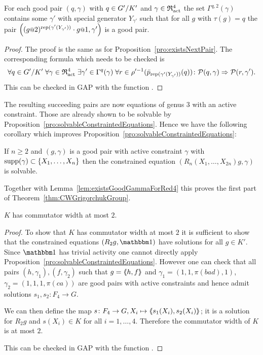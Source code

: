 \documentclass[a4paper,11pt]{amsart}
\begin{document}
\begin{pro}\label{pro:existsNextPair4}
 For each good pair $(q,\gamma)$ with $q\in{G'/K'}$ and $\gamma\in\mathfrak{R}^4_{\operatorname{act}}$ the set 
  $\Gamma^{q,2}(\gamma)$
 contains some $\gamma'$ with special generator $Y_{\gamma'}$ such that for all $g$ with $\tau(g)=q$ the
 pair $\left((g\at{2})^{\rep(\gamma'(Y_{\gamma'}))}\cdot g\at{1},\gamma'\right)$ is a good pair.
\end{pro}
\begin{proof}
The proof is the same as for Proposition~\ref{pro:existsNextPair}. The corresponding formula which needs to be checked is 
\[\forall q\in{G'/K'}\;
      \forall \gamma\in\mathfrak{R}^4_{\operatorname{act}}\;
	 \exists \gamma'\in \Gamma^q(\gamma)\;
	    \forall r\in \rho'^{-1}(\bar p_{\operatorname{rep}(\gamma'(Y_{\gamma'}))}(q))\colon
	      \mathcal{P}(q,\gamma) \Rightarrow \mathcal{P}(r,\gamma').\]
 This can be checked in GAP with the function . 
\end{proof}
The resulting succeeding pairs are now equations of genus $3$ with an active constraint. 
Those are already shown to be solvable 
by Proposition~\ref{pro:solvableConstraintedEquations}. Hence we have the following
corollary which improves Proposition~\ref{pro:solvableConstraintedEquations}:
\begin{cor}\label{cor:solvableConstraintedEquations}
If $n\geq2$ and $(g,\gamma)$ is a good pair with active constraint $\gamma$ with $\operatorname{{supp}}(\gamma)\subset\{X_1,\dotsc,X_{n}\}$
 then the constrained equation $(R_n(X_1,\dotsc,X_{2n})g,\gamma)$ is solvable. 
\end{cor}
Together with Lemma~\ref{lem:existsGoodGammaForRed4} this proves the first part of Theorem~\ref{thm:CWGrigorchukGroup}.
\begin{cor}\label{cor:KhasCW2}
 $K$ has commutator width at most $2$. 
\end{cor}
\begin{proof}
 To show that $K$ has commutator width at most $2$ it is sufficient to show that 
 the constrained equations $(R_2g,\id)$ have solutions for all $g\in K'$. 
 Since $\id$ has trivial activity one cannot directly apply 
 Proposition~\ref{pro:solvableConstraintedEquations}.  However one can check that all 
 pairs $(h,\gamma_1),(f,\gamma_2)$ such that $g=\langle\negthickspace\langle h,f\rangle\negthickspace\rangle$ and
 $\gamma_1=(1,1,\pi(bad),1)$, $\gamma_2=(1,1,1,\pi(ca))$ are good pairs with active
 constraints and hence admit solutions $s_1,s_2\colon F_4\to G$.
 
 We can then define the map $s\colon F_4\to G, X_i\mapsto \langle\negthickspace\langle s_1(X_i),s_2(X_i)\rangle\negthickspace\rangle$; it is a solution
 for $R_2g$ and $s(X_i)\in K$ for all $i=1,\dotsc,4$. Therefore the commutator width of $K$ is at most $2$.
 
 This can be checked in GAP with the function . 
\end{proof}
\end{document}
